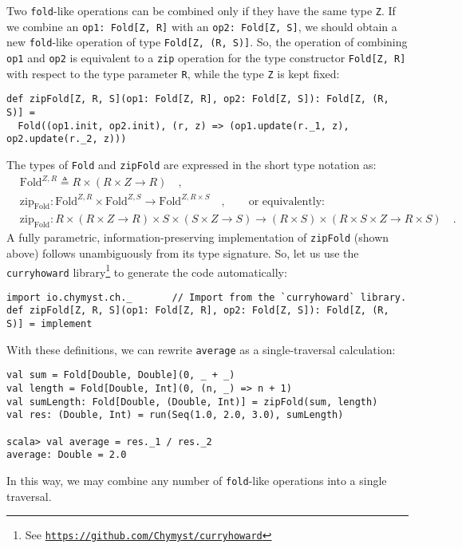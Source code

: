Two \lstinline!fold!-like operations can be combined only if they
have the same type \lstinline!Z!. If we combine an \lstinline!op1: Fold[Z, R]!
with an \lstinline!op2: Fold[Z, S]!, we should obtain a new \lstinline!fold!-like
operation of type \lstinline!Fold[Z, (R, S)]!. So, the operation
of combining \lstinline!op1! and \lstinline!op2! is equivalent to
a \lstinline!zip! operation for the type constructor \lstinline!Fold[Z, R]!
with respect to the type parameter \lstinline!R!, while the type
\lstinline!Z! is kept fixed:
\begin{lstlisting}
def zipFold[Z, R, S](op1: Fold[Z, R], op2: Fold[Z, S]): Fold[Z, (R, S)] =
  Fold((op1.init, op2.init), (r, z) => (op1.update(r._1, z), op2.update(r._2, z)))
\end{lstlisting}

The types of \lstinline!Fold! and \lstinline!zipFold! are expressed
in the short type notation as:
\begin{align*}
 & \text{Fold}^{Z,R}\triangleq R\times\left(R\times Z\rightarrow R\right)\quad,\\
 & \text{zip}_{\text{Fold}}:\text{Fold}^{Z,R}\times\text{Fold}^{Z,S}\rightarrow\text{Fold}^{Z,R\times S}\quad,\quad\quad\text{or equivalently:}\\
 & \text{zip}_{\text{Fold}}:R\times\left(R\times Z\rightarrow R\right)\times S\times\left(S\times Z\rightarrow S\right)\rightarrow\left(R\times S\right)\times(R\times S\times Z\rightarrow R\times S)\quad.
\end{align*}
A fully parametric, information-preserving implementation of \lstinline!zipFold!
(shown above) follows unambiguously from its type signature. So, let
us use the \lstinline!curryhoward!
library\footnote{See \texttt{\href{https://github.com/Chymyst/curryhoward}{https://github.com/Chymyst/curryhoward}}}
to generate the code automatically:
\begin{lstlisting}
import io.chymyst.ch._       // Import from the `curryhoward` library.
def zipFold[Z, R, S](op1: Fold[Z, R], op2: Fold[Z, S]): Fold[Z, (R, S)] = implement
\end{lstlisting}

With these definitions, we can rewrite \lstinline!average! as a single-traversal
calculation:
\begin{lstlisting}
val sum = Fold[Double, Double](0, _ + _)
val length = Fold[Double, Int](0, (n, _) => n + 1)
val sumLength: Fold[Double, (Double, Int)] = zipFold(sum, length)
val res: (Double, Int) = run(Seq(1.0, 2.0, 3.0), sumLength)

scala> val average = res._1 / res._2
average: Double = 2.0
\end{lstlisting}
In this way, we may combine any number of \lstinline!fold!-like operations
into a single traversal. 


